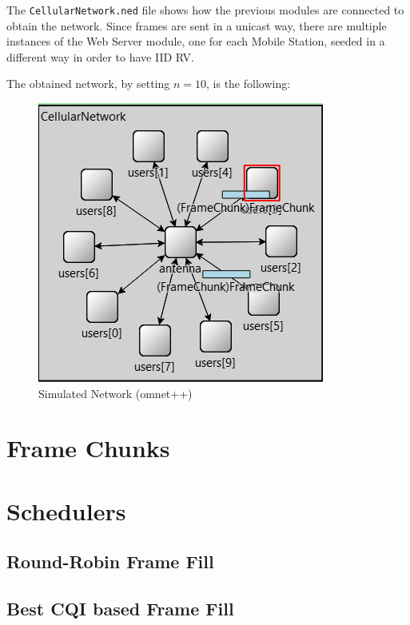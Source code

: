 The \texttt{CellularNetwork.ned} file shows how the previous modules are connected to obtain the network. 
Since frames are sent in a unicast way, there are multiple instances of the Web Server module, one for each Mobile Station, seeded in a different way in order to have IID RV.

The obtained network, by setting \(n=10\), is the following: 
\begin{figure}[H]
  \centering
  \includegraphics{images/network_simulations}
  \caption{Simulated Network (omnet++)}
  \label{fig:simulated_network}
\end{figure}



\section{Frame Chunks}

\section{Schedulers}
	\subsection{Round-Robin Frame Fill}
	\subsection{Best CQI based Frame Fill}